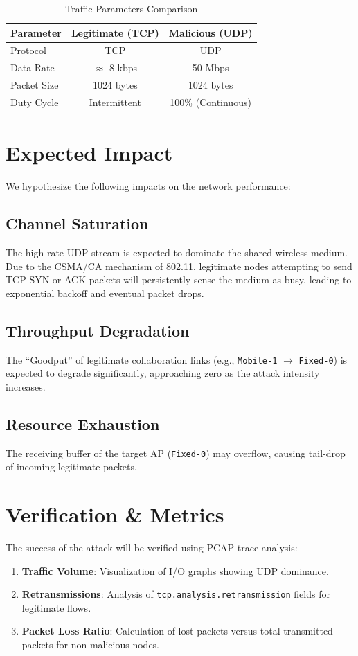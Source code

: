\documentclass[conference]{IEEEtran}
\begin{document}
\begin{table}[htbp]
\caption{Traffic Parameters Comparison}
\begin{center}
\begin{tabular}{|l|c|c|}
\hline
\textbf{Parameter} & \textbf{Legitimate (TCP)} & \textbf{Malicious (UDP)} \\
\hline
Protocol & TCP & UDP \\
\hline
Data Rate & $\approx$ 8 kbps & 50 Mbps \\
\hline
Packet Size & 1024 bytes & 1024 bytes \\
\hline
Duty Cycle & Intermittent & 100\% (Continuous) \\
\hline
\end{tabular}
\label{tab1}
\end{center}
\end{table}

\section{Expected Impact}
We hypothesize the following impacts on the network performance:

\subsection{Channel Saturation}
The high-rate UDP stream is expected to dominate the shared wireless medium. Due to the CSMA/CA mechanism of 802.11, legitimate nodes attempting to send TCP SYN or ACK packets will persistently sense the medium as busy, leading to exponential backoff and eventual packet drops.

\subsection{Throughput Degradation}
The ``Goodput'' of legitimate collaboration links (e.g., \texttt{Mobile-1} $\to$ \texttt{Fixed-0}) is expected to degrade significantly, approaching zero as the attack intensity increases.

\subsection{Resource Exhaustion}
The receiving buffer of the target AP (\texttt{Fixed-0}) may overflow, causing tail-drop of incoming legitimate packets.

\section{Verification & Metrics}
The success of the attack will be verified using PCAP trace analysis:
\begin{enumerate}
    \item \textbf{Traffic Volume}: Visualization of I/O graphs showing UDP dominance.
    \item \textbf{Retransmissions}: Analysis of \texttt{tcp.analysis.retransmission} fields for legitimate flows.
    \item \textbf{Packet Loss Ratio}: Calculation of lost packets versus total transmitted packets for non-malicious nodes.
\end{enumerate}
\end{document}
